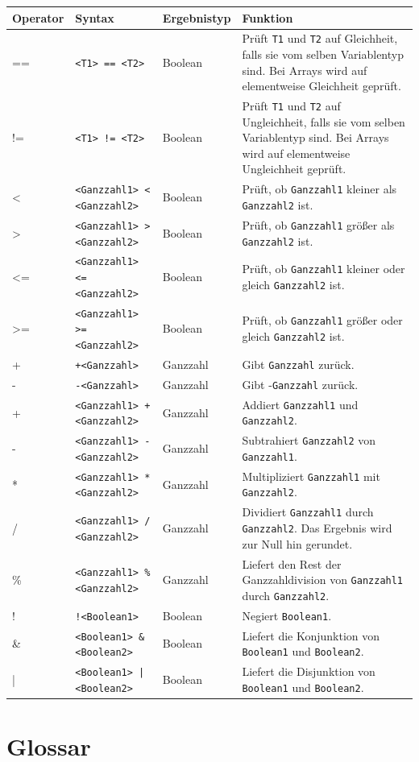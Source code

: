 \documentclass[a4paper,10pt]{article}
\begin{document}
\begin{tabularx}{\textwidth}{| l | l | l | X |}
\hline
\textbf{Operator} & \textbf{Syntax} & \textbf{Ergebnistyp} & \textbf{Funktion}\\
\hline
== & \texttt{<T1> == <T2>} & Boolean & Prüft \texttt{T1} und \texttt{T2} auf Gleichheit, falls sie vom selben Variablentyp sind. Bei Arrays wird auf elementweise Gleichheit geprüft.\\
!= & \texttt{<T1> != <T2>} & Boolean & Prüft \texttt{T1} und \texttt{T2} auf Ungleichheit, falls sie vom selben Variablentyp sind. Bei Arrays wird auf elementweise Ungleichheit geprüft.\\
\hline
< & \texttt{<Ganzzahl1> < <Ganzzahl2>} & Boolean & Prüft, ob \texttt{Ganzzahl1} kleiner als \texttt{Ganzzahl2} ist.\\
> & \texttt{<Ganzzahl1> > <Ganzzahl2>} & Boolean & Prüft, ob \texttt{Ganzzahl1} größer als \texttt{Ganzzahl2} ist.\\
<= & \texttt{<Ganzzahl1> <= <Ganzzahl2>} & Boolean & Prüft, ob \texttt{Ganzzahl1} kleiner oder gleich \texttt{Ganzzahl2} ist.\\
>= & \texttt{<Ganzzahl1> >= <Ganzzahl2>} & Boolean & Prüft, ob \texttt{Ganzzahl1} größer oder gleich \texttt{Ganzzahl2} ist.\\
+ & \texttt{+<Ganzzahl>} & Ganzzahl & Gibt \texttt{Ganzzahl} zurück.\\
- & \texttt{-<Ganzzahl>} & Ganzzahl & Gibt -\texttt{Ganzzahl} zurück.\\
+ & \texttt{<Ganzzahl1> + <Ganzzahl2>} & Ganzzahl & Addiert \texttt{Ganzzahl1} und \texttt{Ganzzahl2}.\\
- & \texttt{<Ganzzahl1> - <Ganzzahl2>} & Ganzzahl & Subtrahiert \texttt{Ganzzahl2} von \texttt{Ganzzahl1}.\\
* & \texttt{<Ganzzahl1> * <Ganzzahl2>} & Ganzzahl & Multipliziert \texttt{Ganzzahl1} mit \texttt{Ganzzahl2}.\\
/ & \texttt{<Ganzzahl1> / <Ganzzahl2>} & Ganzzahl & Dividiert \texttt{Ganzzahl1} durch \texttt{Ganzzahl2}. Das Ergebnis wird zur Null hin gerundet.\\
\% & \texttt{<Ganzzahl1> \% <Ganzzahl2>} & Ganzzahl & Liefert den Rest der Ganzzahldivision von \texttt{Ganzzahl1} durch \texttt{Ganzzahl2}.\\
\hline
! & \texttt{!<Boolean1>} & Boolean & Negiert \texttt{Boolean1}.\\
\& & \texttt{<Boolean1> \& <Boolean2>} & Boolean & Liefert die Konjunktion von \texttt{Boolean1} und \texttt{Boolean2}.\\
| & \texttt{<Boolean1> | <Boolean2>} & Boolean & Liefert die Disjunktion von \texttt{Boolean1} und \texttt{Boolean2}.\\
\hline
\end{tabularx}

\section{Glossar}
\end{document}

